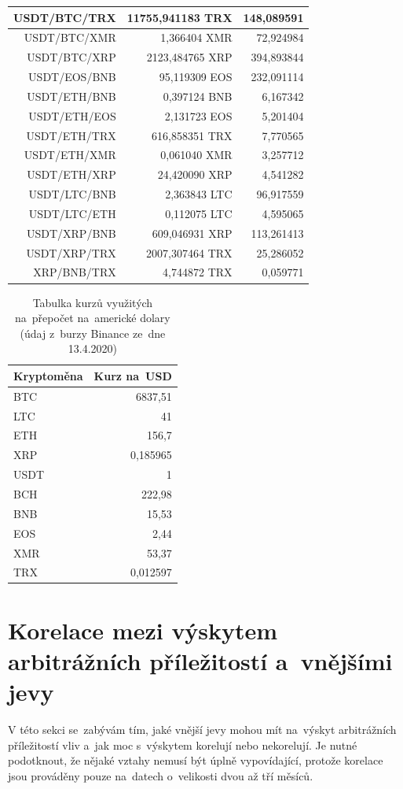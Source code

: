 \documentclass[thesis=B,czech]{FITthesis}[2019/03/21]
\begin{document}
\begin{table}
\begin{tabular}{|| r | r | r ||}
 \hline USDT/BTC/TRX & 11755,941183 TRX & 148,089591\\ 
 \hline USDT/BTC/XMR & 1,366404 XMR & 72,924984\\ 
 \hline USDT/BTC/XRP & 2123,484765 XRP & 394,893844\\ 
 \hline USDT/EOS/BNB & 95,119309 EOS & 232,091114\\ 
 \hline USDT/ETH/BNB & 0,397124 BNB & 6,167342\\ 
 \hline USDT/ETH/EOS & 2,131723 EOS & 5,201404\\ 
 \hline USDT/ETH/TRX & 616,858351 TRX & 7,770565\\ 
 \hline USDT/ETH/XMR & 0,061040 XMR & 3,257712\\ 
 \hline USDT/ETH/XRP & 24,420090 XRP & 4,541282\\ 
 \hline USDT/LTC/BNB & 2,363843 LTC & 96,917559\\ 
 \hline USDT/LTC/ETH & 0,112075 LTC & 4,595065\\ 
 \hline USDT/XRP/BNB & 609,046931 XRP & 113,261413\\ 
 \hline USDT/XRP/TRX & 2007,307464 TRX & 25,286052\\ 
 \hline XRP/BNB/TRX & 4,744872 TRX & 0,059771\\ 
 \hline
\end{tabular}
\end{table}

\begin{table}\centering
\caption{Tabulka kurzů využitých na~přepočet na~americké dolary (údaj z~burzy Binance ze~dne 13.4.2020)}
\label{table_rates}
\begin{tabular}{|| l | r ||}
\hline Kryptoměna & Kurz na~USD \\ 
\hline\hline BTC & 6837,51 \\ 
\hline LTC & 41 \\ 
\hline ETH & 156,7 \\ 
\hline XRP & 0,185965 \\ 
\hline USDT & 1 \\ 
\hline BCH & 222,98 \\ 
\hline BNB & 15,53 \\ 
\hline EOS & 2,44 \\ 
\hline XMR & 53,37 \\ 
\hline TRX & 0,012597 \\ 
\hline
\end{tabular}
\end{table}


\section{Korelace mezi výskytem arbitrážních příležitostí a~vnějšími jevy}
V této sekci se~zabývám tím, jaké vnější jevy mohou mít na~výskyt arbitrážních příležitostí vliv a~jak moc s~výskytem korelují nebo nekorelují. Je nutné podotknout, že nějaké vztahy nemusí být úplně vypovídající, protože korelace jsou prováděny pouze na~datech o~velikosti dvou až tří měsíců.
\end{document}
